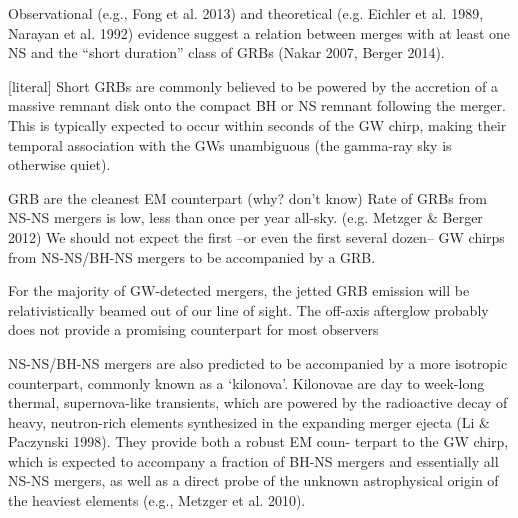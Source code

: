 Observational (e.g., Fong et al. 2013) and theoretical (e.g. Eichler et al. 1989, Narayan et al. 1992) evidence suggest a relation between merges with at least one NS and the ``short duration'' class of GRBs (Nakar 2007, Berger 2014). 

[literal] Short GRBs are commonly believed to be powered by the accretion of a massive remnant disk onto the compact BH or NS remnant following the merger. This is typically expected to occur within seconds of the GW chirp, making their temporal association with the GWs unambiguous (the gamma-ray sky is otherwise quiet).

GRB are the cleanest EM counterpart (why? don't know)
Rate of GRBs from NS-NS mergers is low, less than once per year all-sky. (e.g. Metzger \& Berger 2012)
We should not expect the first --or even the first several dozen-- GW chirps from NS-NS/BH-NS mergers to be accompanied by a GRB.

For the majority of GW-detected mergers, the jetted GRB emission will be relativistically beamed out of our line of sight.
The off-axis afterglow probably does not provide a promising counterpart for most observers


NS-NS/BH-NS mergers are also predicted to be accompanied by a more isotropic counterpart, commonly known as a `kilonova'. Kilonovae are day to week-long thermal, supernova-like transients, which are powered by the radioactive decay of heavy, neutron-rich elements synthesized in the expanding merger ejecta (Li \& Paczynski 1998). They provide both a robust EM coun- terpart to the GW chirp, which is expected to accompany a fraction of BH-NS mergers and essentially all NS-NS mergers, as well as a direct probe of the unknown astrophysical origin of the heaviest elements (e.g., Metzger et al. 2010).

